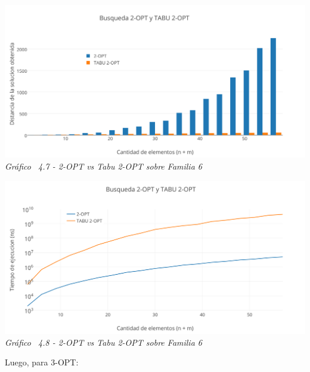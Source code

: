 \vspace*{0.3cm} \vspace*{0.3cm}
  \begin{center}
 \includegraphics[scale=0.5]{./EJ4/comparativosinorden2opt.png}\\
 {            \textit{Gráfico \ 4.7 - 2-OPT vs Tabu 2-OPT sobre Familia 6}}
  \end{center}
  \vspace*{0.3cm}

\vspace*{0.3cm} \vspace*{0.3cm}
  \begin{center}
 \includegraphics[scale=0.5]{./EJ4/medicion2optsinorden.png}\\
 {            \textit{Gráfico \ 4.8 - 2-OPT vs Tabu 2-OPT sobre Familia 6}}
  \end{center}
  \vspace*{0.3cm}

Luego, para 3-OPT:


